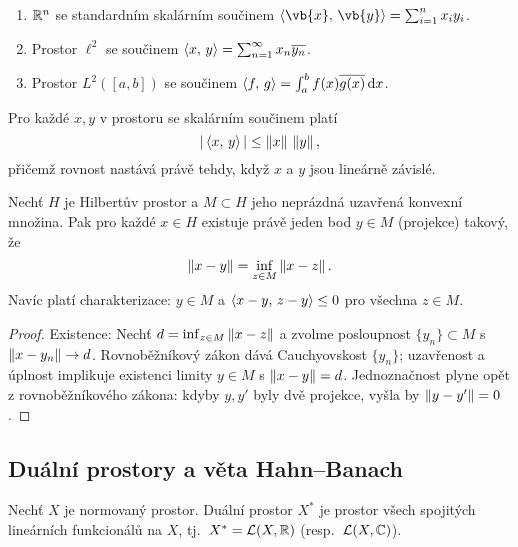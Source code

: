 \begin{example}
\label{ex:hilbert-prostory}
\begin{enumerate}
\item $\mathbb{R}^n$ se standardním skalárním součinem $\ip{\vb{x}}{\vb{y}}=\sum_{i=1}^n x_i y_i$.
\item Prostor $\ell^2$ se součinem $\left\langle x,\, y \right\rangle=\sum_{n=1}^\infty x_n\overline{y_n}$.
\item Prostor $L^2([a,b])$ se součinem $\left\langle f,\, g \right\rangle=\int_a^b f(x)\overline{g(x)}\,\mathrm{d} x$.
\end{enumerate}
\end{example}

\begin{theorem}
\label{vet:cauchy-schwarz}
Pro každé $x,y$ v prostoru se skalárním součinem platí
\[
|\left\langle x,\, y \right\rangle|\le \left\lVert x \right\rVert\,\left\lVert y \right\rVert,
\]
přičemž rovnost nastává právě tehdy, když $x$ a $y$ jsou lineárně závislé.
\end{theorem}

\begin{theorem}
\label{vet:o-projekci}
Nechť $H$ je Hilbertův prostor a $M\subset H$ jeho neprázdná uzavřená konvexní množina. Pak pro každé $x\in H$ existuje právě jeden bod $y\in M$ (projekce) takový, že
\[
\left\lVert x-y \right\rVert=\inf_{z\in M}\left\lVert x-z \right\rVert.
\]
Navíc platí charakterizace: $y\in M$ a $\left\langle x-y,\, z-y \right\rangle\le 0$ pro všechna $z\in M$.
\end{theorem}

\begin{proof}
Existence: Nechť $d=\inf_{z\in M}\left\lVert x-z \right\rVert$ a zvolme posloupnost $\{y_n\}\subset M$ s $\left\lVert x-y_n \right\rVert\to d$. Rovnoběžníkový zákon dává Cauchyovskost $\{y_n\}$; uzavřenost a úplnost implikuje existenci limity $y\in M$ s $\left\lVert x-y \right\rVert=d$. Jednoznačnost plyne opět z rovnoběžníkového zákona: kdyby $y,y'$ byly dvě projekce, vyšla by $\left\lVert y-y' \right\rVert=0$.
\end{proof}

\spc

\subsection{Duální prostory a věta Hahn–Banach}
\label{subsec:dualni-prostory}

\begin{definition}
\label{def:dualni-prostor}
Nechť $X$ je normovaný prostor. Duální prostor $X^*$ je prostor všech spojitých lineárních funkcionálů na $X$, tj.\ $X^*=\mathcal{L}(X,\mathbb{R})$ (resp.\ $\mathcal{L}(X,\mathbb{C})$).
\end{definition}

